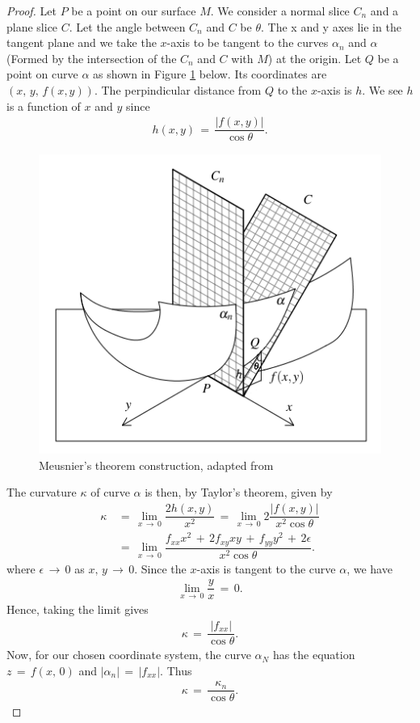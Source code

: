 \documentclass{UKZNcomp}
\theoremstyle{definition}
\theoremstyle{remark}
\begin{document}
\begin{proof}
Let $P$ be a point on our surface $M$. We consider a normal slice $C_n$ and a plane slice $C$. Let the angle between $C_n$ and $C$ be $\theta$. The x and y axes lie in the tangent plane and we take the $x$-axis to be tangent to the curves $\alpha_n$ and $\alpha$ (Formed by the intersection of the $C_n$ and $C$ with $M$) at the origin. Let $Q$ be a point on curve $\alpha$ as shown in Figure \ref{fig:Meusnier} below. Its coordinates are $(x,\,y,\,f(x,y))$. The perpindicular distance from $Q$ to the $x$-axis is $h$. We see $h$ is a function of $x$ and $y$ since
\begin{align*}
h(x,y)\,=\,\dfrac{\lvert f(x,y)\rvert}{\cos\theta}.
\end{align*}

\begin{figure}[H]
    \centerline{\includegraphics[scale=0.95]{Meusnier}}
    \caption[Meusnier's Theorem]{\label{fig:Meusnier}
    Meusnier's theorem construction, adapted from \cite{DC1976}}
\end{figure}

The curvature $\kappa$ of curve $\alpha$ is then, by Taylor's theorem, given by
\begin{align*}
\kappa\,&=\,\lim_{x\,\to\,0}\dfrac{2h(x,y)}{x^2}\,=\,\lim_{x\,\to\,0}2\dfrac{\lvert f(x,y)\rvert}{x^2\cos\theta}\\
&=\,\lim_{x\,\to\,0}\dfrac{f_{xx}x^2\,+\,2f_{xy}xy\,+\,f_{yy}y^2\,+\,2\epsilon}{x^2\cos\theta}.
\end{align*}
where $\epsilon\,\to\,0$ as $x,\,y\,\to\,0$. Since the $x$-axis is tangent to the curve $\alpha$, we have
\begin{align*}
\lim_{x\,\to\,0}\dfrac{y}{x}\,=\,0.
\end{align*}
Hence, taking the limit gives
\begin{align*}
\kappa\,=\,\dfrac{\lvert f_{xx}\rvert}{\cos\theta}.
\end{align*}
Now, for our chosen coordinate system, the curve $\alpha_N$ has the equation $z\,=\,f(x,\,0)$ and $\lvert\alpha_n\rvert\,=\,\lvert f_{xx} \rvert$. Thus
\begin{align*}
\kappa\,=\,\dfrac{\kappa_n}{\cos\theta}.
\end{align*}
\end{proof}
\end{document}

